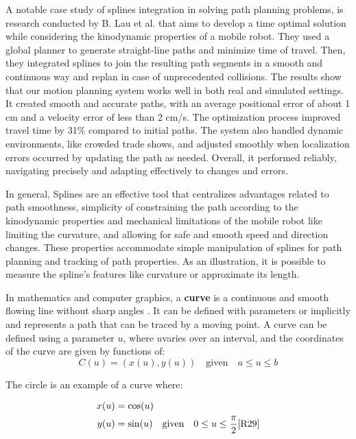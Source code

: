 A notable case study of splines integration in solving path planning problems, is research conducted 
by B. Lau et al. \cite{R30} that aims to develop a time optimal solution while considering the kinodynamic 
properties of a mobile robot. They used a global planner to generate straight-line paths and minimize time 
of travel. Then, they  integrated splines to join the resulting path segments in a smooth and continuous 
way and replan in case of unprecedented collisions. The results show that our motion planning system works 
well in both real and simulated settings. It created smooth and accurate paths, with an average positional 
error of about 1 cm and a velocity error of less than 2 cm/s. The optimization process improved travel 
time by 31\% compared to initial paths. The system also handled dynamic environments, like crowded trade 
shows, and adjusted smoothly when localization errors occurred by updating the path as needed. Overall, 
it performed reliably, navigating precisely and adapting effectively to changes and errors.

In general, Splines are an effective tool that centralizes advantages related to path smoothness,
simplicity of constraining the path according to the kinodynamic properties and mechanical
limitations of the mobile robot like limiting the curvature, and allowing for safe and smooth
speed and direction changes. These properties accommodate simple manipulation of splines for
path planning and tracking of path properties. As an illustration, it is possible to measure the
spline’s features like curvature or approximate its length.


In mathematics and computer graphics, a \textbf{curve} is a continuous and smooth flowing line without 
sharp angles . 
It can be defined with parameters or implicitly and represents a path that can be traced by a moving point.
A curve can be defined using a parameter 
\(u\), where \(u\)varies over an interval, and the coordinates of the curve are given by functions of:
\begin{equation}
    C(u) = (x(u), y(u)) \quad \text{given} \quad a \leq u \leq b \label{eq:curve}
\end{equation}

The circle is an example of a curve where:

\hspace*{-1cm} %
\begin{align}
    x(u) &= \cos(u) \\
    y(u) &= \sin(u) \quad \text{given} \quad 0 \leq u \leq \frac{\pi}{2}     \cite{R29}
\end{align}

